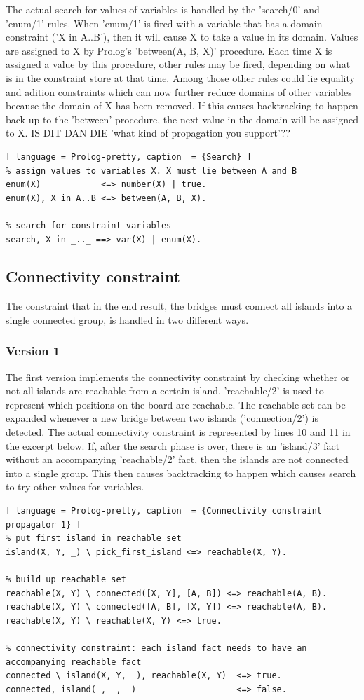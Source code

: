 \documentclass{report}
\begin{document}
The actual search for values of variables is handled by the 'search/0' and 'enum/1' rules. When 'enum/1' is fired with a variable that has a domain constraint ('X in A..B'), then it will cause X to take a value in its domain. Values are assigned to X by Prolog's 'between(A, B, X)' procedure. Each time X is assigned a value by this procedure, other rules may be fired, depending on what is in the constraint store at that time. Among those other rules could lie equality and adition constraints which can now further reduce domains of other variables because the domain of X has been removed. If this causes backtracking to happen back up to the 'between' procedure, the next value in the domain will be assigned to X. IS DIT DAN DIE 'what kind of propagation you support'?? 
\begin{lstlisting}[ language = Prolog-pretty, caption  = {Search} ]
% assign values to variables X. X must lie between A and B
enum(X)            <=> number(X) | true.
enum(X), X in A..B <=> between(A, B, X).

% search for constraint variables
search, X in _.._ ==> var(X) | enum(X).
\end{lstlisting}

\subsection{Connectivity constraint}
The constraint that in the end result, the bridges must connect all islands into a single connected group, is handled in two different ways.

\subsubsection{Version 1}
The first version implements the connectivity constraint by checking whether or not all islands are reachable from a certain island. 'reachable/2' is used to represent which positions on the board are reachable. The reachable set can be expanded whenever a new bridge between two islands ('connection/2') is detected. The actual connectivity constraint is represented by lines 10 and 11 in the excerpt below. If, after the search phase is over, there is an 'island/3' fact without an accompanying 'reachable/2' fact, then the islands are not connected into a single group. This then causes backtracking to happen which causes search to try other values for variables.

\begin{lstlisting}[ language = Prolog-pretty, caption  = {Connectivity constraint propagator 1} ]
% put first island in reachable set
island(X, Y, _) \ pick_first_island <=> reachable(X, Y).

% build up reachable set
reachable(X, Y) \ connected([X, Y], [A, B]) <=> reachable(A, B).
reachable(X, Y) \ connected([A, B], [X, Y]) <=> reachable(A, B).
reachable(X, Y) \ reachable(X, Y) <=> true.

% connectivity constraint: each island fact needs to have an accompanying reachable fact
connected \ island(X, Y, _), reachable(X, Y)  <=> true.
connected, island(_, _, _)                    <=> false.
\end{lstlisting}
\end{document}
